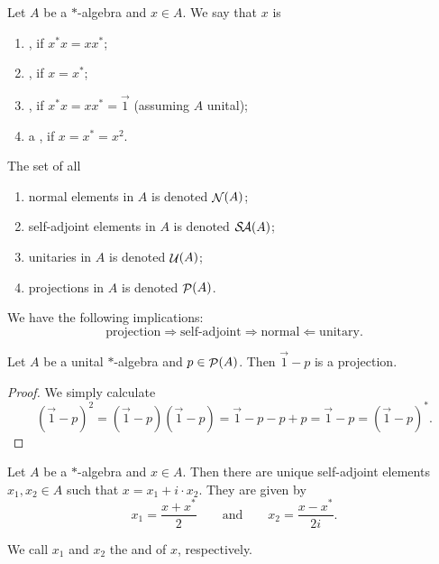 \begin{definition}
Let $A$ be a $*$-algebra and $x\in A$. We say that $x$ is
\begin{enumerate}
\item {}, if $x^*x = xx^*$;
\item {}, if $x=x^*$;
\item {}, if $x^*x = xx^* = \vec{1}$ (assuming $A$ unital);
\item a , if $x=x^*=x^2$.
\end{enumerate}
The set of all
\begin{enumerate}
\item normal elements in $A$ is denoted $\mathop{\mathcal{N}}\nolimits(A)$;
\item self-adjoint elements in $A$ is denoted $\mathop{\mathcal{S}\hspace{-0.15em}\mathcal{A}}\nolimits(A)$;
\item unitaries in $A$ is denoted $\mathop{\mathcal{U}}\nolimits(A)$;
\item projections in $A$ is denoted $\mathop{\mathcal{P}}\nolimits(A)$.
\end{enumerate}

\end{definition}
\begin{lemma}
We have the following implications:
\[ \text{projection} \Rightarrow \text{self-adjoint} \Rightarrow \text{normal} \Leftarrow \text{unitary}. \]
\end{lemma}

\begin{lemma} \label{orthogonalProjection}
Let $A$ be a unital $*$-algebra and $p\in\mathop{\mathcal{P}}\nolimits(A)$. Then $\vec{1}-p$ is a projection.
\end{lemma}
\begin{proof}
We simply calculate
\[ (\vec{1}-p)^2 = (\vec{1}-p)(\vec{1}-p) = \vec{1} - p -p + p = \vec{1}-p = (\vec{1}-p)^*. \]
\end{proof}

\begin{lemma} \label{realImaginaryParts}
Let $A$ be a $*$-algebra and $x\in A$. Then there are unique self-adjoint elements $x_1,x_2\in A$ such that $x = x_1+i\cdot x_2$. They are given by
\[ x_1 = \frac{x+x^*}{2} \qquad \text{and} \qquad x_2 = \frac{x-x^*}{2i}. \]
\end{lemma}
We call $x_1$ and $x_2$ the  and  of $x$, respectively.

